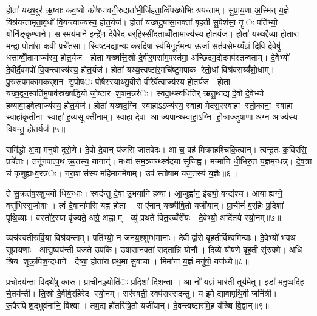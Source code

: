 होता॑ यख्ष॒द्दुर॑ ऋ॒ष्वाः क॑व॒ष्यो को॑षधावनी॒रुदाता॑भी॒र्जिह॑ता॒व्विँपख्षो॑भिः श्रयन्ताम्। सु॒प्रा॒य॒णा अ॒स्मिन् य॒ज्ञे विश्र॑यन्तामृता॒वृधो॑ वि॒यन्त्वाज्य॑स्य॒ होत॒र्यज॑। होता॑ यख्षदु॒षासा॒नक्ता॑ बृह॒ती सु॒पेश॑सा॒ नॄः पति॑भ्यो॒ योनि॑ङ्कृण्वा॒ने। स॒स्मय॑माने॒ इन्द्रे॑ण दे॒वैरेदं ब॒र्॒हिस्सी॑दताव्वीँ॒तामाज्य॑स्य॒ होत॒र्यज॑। होता॑ यख्ष॒द्दैव्या॒ होता॑रा म॒न्द्रा पोता॑रा क॒वी प्रचे॑तसा। स्वि॑ष्टम॒द्यान्यः क॑रदि॒षा स्व॑भिगूर्तम॒न्य ऊ॒र्जा सत॑वसे॒मय्यँ॒ज्ञं दि॒वि दे॒वेषु॑ धत्ताव्वीँ॒तामाज्य॑स्य॒ होत॒र्यज॑। होता॑ यख्षत्ति॒स्रो दे॒वीर॒पसा॑म॒पस्त॑मा॒ अच्छि॑द्रम॒द्येदमप॑स्तन्वताम्। दे॒वेभ्यो॑ दे॒वीर्दे॒वमपो॑ वि॒यन्त्वाज्य॑स्य॒ होत॒र्यज॑। होता॑ यख्ष॒त्त्वष्टा॑र॒मचि॑ष्टु॒मपा॑क रेतो॒धां विश्र॑वसय्यँशो॒धाम्। पु॒रु॒रूप॒मका॑मकर्‌शन सु॒पोष॒ः पोषै॒स्स्याथ्सु॒वीरो॑ वी॒रैर्वेत्वाज्य॑स्य॒ होत॒र्यज॑। होता॑ यख्ष॒द्वन॒स्पति॑मु॒पाव॑स्रख्षद्धि॒यो जो॒ष्टार श॒शम॒न्नर॑ः। स्वदा॒थ्स्वधि॑तिर् ऋतु॒थाद्य दे॒वो दे॒वेभ्यो॑ ह॒व्यावा॒ड्वेत्वाज्य॑स्य॒ होत॒र्यज॑। होता॑ यख्षद॒ग्नि स्वाहाऽऽज्य॑स्य॒ स्वाहा॒ मेद॑स॒स्स्वाहा स्तो॒काना॒ स्वाहा॒ स्वाहा॑कृतीना॒ स्वाहा॑ ह॒व्यसूक्तीनाम्। स्वाहा॑ दे॒वा आज्य॒पान्थ्स्वाहा॒ऽग्नि हो॒त्राज्जु॑षा॒णा अग्न॒ आज्य॑स्य वियन्तु॒ होत॒र्यज॑॥५॥


समि॑द्धो अ॒द्य मनु॑षो दुरो॒णे। दे॒वो दे॒वान् य॑जसि जातवेदः। आ च॒ वह॑ मित्रमहश्चिकि॒त्वान्। त्वन्दू॒तः क॒विर॑सि॒ प्रचे॑ताः। तनू॑नपात्प॒थ ऋ॒तस्य॒ यानान्॑। मध्वा॑ सम॒ञ्जन्थ्स्व॑दया सुजिह्व। मन्मा॑नि धी॒भिरु॒त य॒ज्ञमृ॒न्धन्न्। दे॒व॒त्रा च॑ कृणुह्यध्व॒रन्न॑ः। नरा॒शस॑स्य महि॒मान॑मेषाम्। उप॑ स्तोषाम यज॒तस्य॑ य॒ज्ञैः॥६॥

ते सु॒क्रत॑व॒श्शुच॑यो धिय॒न्धाः। स्वद॑न्तु दे॒वा उ॒भया॑नि ह॒व्या। आ॒जुह्वा॑न॒ ईड्यो॒ वन्द्य॑श्च। आयाह्यग्ने॒ वसु॑भिस्स॒जोषाः। त्वं दे॒वाना॑मसि यह्व॒ होता। स ए॑नान् यख्षीषि॒तो यजी॑यान्। प्रा॒चीनं॑ ब॒र्‌हिः प्र॒दिशा॑ पृथि॒व्याः। वस्तो॑र॒स्या वृ॑ज्यते॒ अग्रे॒ अह्नाम्। व्यु॑ प्रथते वित॒रव्वँरी॑यः। दे॒वेभ्यो॒ अदि॑तये स्यो॒नम्॥७॥

व्यच॑स्वतीरुर्वि॒या विश्र॑यन्ताम्। पति॑भ्यो॒ न जन॑य॒श्शुम्भ॑मानाः। देवीर्द्वारो बृहतीर्विश्वमिन्वाः। दे॒वेभ्यो॑ भवथ सुप्राय॒णाः। आसु॒ष्वय॑न्ती यज॒ते उपा॑के। उ॒षासा॒नक्ता॑ सदता॒न्नि योनौ। दि॒व्ये योष॑णे बृह॒ती सु॑रु॒क्मे। अधि॒ श्रिय शुक्र॒पिश॒न्दधा॑ने। दैव्या॒ होता॑रा प्रथ॒मा सु॒वाचा। मिमा॑ना य॒ज्ञं मनु॑षो॒ यज॑ध्यै॥८॥

प्र॒चो॒दय॑न्ता वि॒दथे॑षु का॒रू। प्रा॒चीन॒ञ्ज्योति॑ः प्र॒दिशा॑ दि॒शन्ता। आ नो॑ य॒ज्ञं भार॑ती॒ तूय॑मेतु। इडा॑ मनु॒ष्वदि॒ह चे॒तय॑न्ती। ति॒स्रो दे॒वीर्ब॒र्‌हिरेद स्यो॒नम्। सर॑स्वती॒ स्वप॑सस्सदन्तु। य इ॒मे द्यावा॑पृथि॒वी जनि॑त्री। रू॒पैरपिश॒द्भुव॑नानि॒ विश्वा। तम॒द्य हो॑तरिषि॒तो यजी॑यान्। दे॒वन्त्वष्टा॑रमि॒ह य॑ख्षि वि॒द्वान्॥९॥

